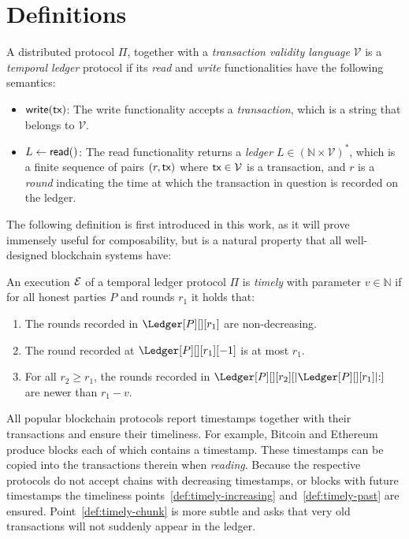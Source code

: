 \section{Definitions}\label{sec:definitions}

\begin{definition}
  A distributed protocol $\Pi$, together with a \emph{transaction validity language} $\mathcal{V}$
  is a \emph{temporal ledger} protocol if its \emph{read} and \emph{write}
  functionalities have the following semantics:

  \begin{itemize}
    \item $\textsf{write}(\textsf{tx})$: The write functionality accepts a \emph{transaction}, which is
          a string that belongs to $\mathcal{V}$.
    \item $L \gets \textsf{read}()$: The read functionality returns a \emph{ledger} $L \in (\mathbb{N} \times \mathcal{V})^*$, which is
          a finite sequence of pairs $(r, \textsf{tx})$ where $\textsf{tx} \in \mathcal{V}$ is a transaction, and
          $r$ is a \emph{round} indicating the time at which the transaction in question
          is recorded on the ledger.
  \end{itemize}
\end{definition}

The following definition is first introduced in this work,
as it will prove
immensely useful for composability, but is a natural property that all well-designed
blockchain systems have:

\begin{definition}[Timely]\label{def:timely}
  An execution $\mathcal{E}$ of a temporal ledger protocol $\Pi$ is \emph{timely} with parameter $v \in \mathbb{N}$
  if for all honest parties $P$ and rounds $r_1$ it holds that:

  \begin{enumerate}
    \item The rounds recorded in $\Ledger[P][][r_1]$ are non-decreasing.\label{def:timely-increasing}
    \item The round recorded at $\Ledger[P][][r_1][-1]$ is at most $r_1$.\label{def:timely-past}
    \item For all $r_2 \geq r_1$, the rounds recorded in $\Ledger[P][][r_2][|\Ledger[P][][r_1]|{:}]$ are
          newer than $r_1 - v$.\label{def:timely-chunk}
  \end{enumerate}
\end{definition}

All popular blockchain protocols report timestamps together with their
transactions and ensure their timeliness. For example, Bitcoin and Ethereum
produce blocks each of which contains a timestamp. These timestamps can be copied
into the transactions therein when \emph{reading}. Because the respective protocols do not accept
chains with decreasing timestamps, or blocks with future timestamps the timeliness
points~\ref{def:timely-increasing} and~\ref{def:timely-past} are ensured.
Point~\ref{def:timely-chunk} is more subtle and asks that very old transactions will
not suddenly appear in the ledger.

